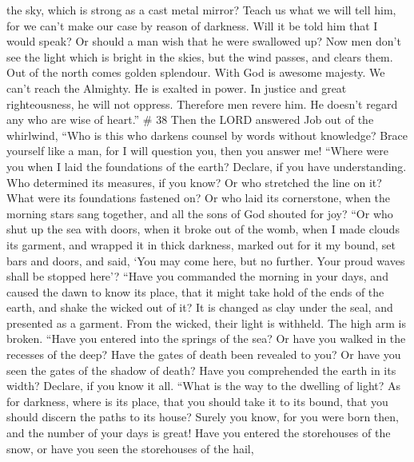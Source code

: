 the sky, which is strong as a cast metal mirror?  Teach us
what we will tell him, for we can't make our case by reason of darkness.
 Will it be told him that I would speak? Or should a man
wish that he were swallowed up?  Now men don't see the
light which is bright in the skies, but the wind passes, and clears
them.  Out of the north comes golden splendour. With God is
awesome majesty.  We can't reach the Almighty. He is
exalted in power. In justice and great righteousness, he will not
oppress.  Therefore men revere him. He doesn't regard any
who are wise of heart.'' \# 38  Then the LORD answered Job
out of the whirlwind,  ``Who is this who darkens counsel by
words without knowledge?  Brace yourself like a man, for I
will question you, then you answer me!  ``Where were you
when I laid the foundations of the earth? Declare, if you have
understanding.  Who determined its measures, if you know? Or
who stretched the line on it?  What were its foundations
fastened on? Or who laid its cornerstone,  when the morning
stars sang together, and all the sons of God shouted for joy?
 ``Or who shut up the sea with doors, when it broke out of
the womb,  when I made clouds its garment, and wrapped it in
thick darkness,  marked out for it my bound, set bars and
doors,  and said, `You may come here, but no further. Your
proud waves shall be stopped here'?  ``Have you commanded
the morning in your days, and caused the dawn to know its place,
 that it might take hold of the ends of the earth, and
shake the wicked out of it?  It is changed as clay under
the seal, and presented as a garment.  From the wicked,
their light is withheld. The high arm is broken.  ``Have
you entered into the springs of the sea? Or have you walked in the
recesses of the deep?  Have the gates of death been
revealed to you? Or have you seen the gates of the shadow of death?
 Have you comprehended the earth in its width? Declare, if
you know it all.  ``What is the way to the dwelling of
light? As for darkness, where is its place,  that you
should take it to its bound, that you should discern the paths to its
house?  Surely you know, for you were born then, and the
number of your days is great!  Have you entered the
storehouses of the snow, or have you seen the storehouses of the hail,
